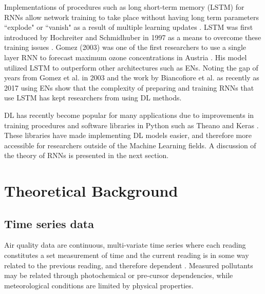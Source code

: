 Implementations of procedures such as long short-term memory (LSTM) for RNNs allow network training to take place without having long term parameters ``explode" or ``vanish" as a result of multiple learning updates \citep{Pascanu2013}. LSTM was first introduced by Hochreiter and Schmidhuber in 1997 as a means to overcome these training issues \citep{Hochreiter1997}. Gomez (2003) was one of the first researchers to use a single layer RNN to forecast maximum ozone concentrations in Austria \citep{Gomez2003}. His model utilized LSTM to outperform other architectures such as ENs. Noting the gap of years from Gomez et al. in 2003 and the work by Biancofiore et al. as recently as 2017 using ENs show that the complexity of preparing and training RNNs that use LSTM has kept researchers from using DL methods.

DL has recently become popular for many applications due to improvements in training procedures and software libraries in Python such as Theano \citep{Theano2016} and Keras \citep{keras2015}. These libraries have made implementing DL models easier, and therefore more accessible for researchers outside of the Machine Learning fields. A discussion of the theory of RNNs is presented in the next section.

\section{Theoretical Background}

\subsection{Time series data}
Air quality data are continuous, multi-variate time series where each reading constitutes a set measurement of time and the current reading is in some way related to the previous reading, and therefore dependent \citep{Gheyas2011}. Measured pollutants may be related through photochemical or pre-cursor dependencies, while meteorological conditions are limited by physical properties. 

